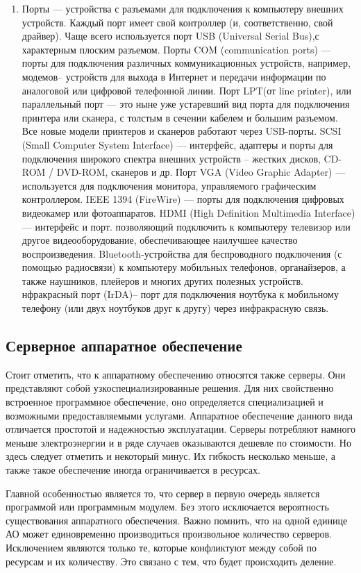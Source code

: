 \documentclass[12pt]{article}
\begin{document}
\begin{enumerate}[wide, labelwidth=!, labelindent=0pt]
		\item Порты --- устройства с разъемами для подключения к компьютеру внешних устройств. Каждый порт имеет свой контроллер (и, соответственно, свой драйвер). Чаще всего используется порт USB (Universal Serial Bus),с характерным плоским разъемом. Порты COM (communication ports) --- порты для подключения различных коммуникационных устройств, например, модемов– устройств для выхода в Интернет и передачи информации по аналоговой или цифровой телефонной линии. Порт LPT(от line printer), или параллельный порт --- это ныне уже устаревший вид порта для подключения принтера или сканера, с толстым в сечении кабелем и большим разъемом. Все новые модели принтеров и сканеров работают через USB-порты. SCSI (Small Computer System Interface) --- интерфейс, адаптеры и порты для подключения широкого спектра внешних устройств – жестких дисков, CD-ROM / DVD-ROM, сканеров и др. Порт VGA (Video Graphic Adapter) --- используется для подключения монитора, управляемого графическим контроллером. IEEE 1394 (FireWire) --- порты для подключения цифровых видеокамер или фотоаппаратов. HDMI (High Definition Multimedia Interface) --- интерфейс и порт. позволяющий подключить к компьютеру телевизор или другое видеооборудование, обеспечивающее наилучшее качество воспроизведения. Bluetooth-устройства для беспроводного подключения (с помощью радиосвязи) к компьютеру мобильных телефонов, органайзеров, а также наушников, плейеров и многих других полезных устройств. нфракрасный порт (IrDA)– порт для подключения ноутбука к мобильному телефону (или двух ноутбуков друг к другу) через инфракрасную связь.
	\end{enumerate}	
	
	\subsection*{Серверное аппаратное обеспечение}
	Стоит отметить, что к аппаратному обеспечению относятся также серверы. Они представляют собой узкоспециализированные решения. Для них свойственно встроенное программное обеспечение, оно определяется специализацией и возможными предоставляемыми услугами. Аппаратное обеспечение данного вида отличается простотой и надежностью эксплуатации. Серверы потребляют намного меньше электроэнергии и в ряде случаев оказываются дешевле по стоимости. Но здесь следует отметить и некоторый минус. Их гибкость несколько меньше, а также такое обеспечение иногда ограничивается в ресурсах.
	
	Главной особенностью является то, что сервер в первую очередь является программой или программным модулем. Без этого исключается вероятность существования аппаратного обеспечения. Важно помнить, что на одной единице АО может единовременно производиться произвольное количество серверов. Исключением являются только те, которые конфликтуют между собой по ресурсам и их количеству. Это связано с тем, что будет происходить деление.
	
\end{document}
